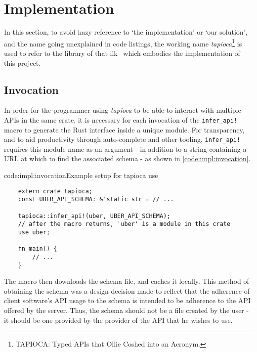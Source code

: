 \section{Implementation} \label{impl}

In this section, to avoid hazy reference to `the implementation' or `our solution', and the name going unexplained in code listings, the working name \emph{tapioca}\footnote{TAPIOCA: Typed APIs that Ollie Coshed into an Acronym.} is used to refer to the library of that ilk~\cite{tapioca} which embodies the implementation of this project.



\subsection{Invocation} \label{impl:invocation}

In order for the programmer using \emph{tapioca} to be able to interact with multiple APIs in the same crate, it is necessary for each invocation of the \texttt{infer_api!} macro to generate the Rust interface inside a unique module. For transparency, and to aid productivity through auto-complete and other tooling, \texttt{infer_api!} requires this module name as an argument - in addition to a string containing a URL at which to find the associated schema - as shown in \cref{code:impl:invocation}.

\begin{codelisting}{code:impl:invocation}{Example setup for tapioca use}
\begin{verbatim}
    extern crate tapioca;
    const UBER_API_SCHEMA: &'static str = // ...
    
    tapioca::infer_api!(uber, UBER_API_SCHEMA);
    // after the macro returns, 'uber' is a module in this crate
    use uber;
    
    fn main() {
        // ...
    }
\end{verbatim}
\end{codelisting}

The macro then downloads the schema file, and caches it locally. This method of obtaining the schema was a design decision made to reflect that the adherence of client software's API usage to the schema is intended to be adherence to the API offered by the server. Thus, the schema should not be a file created by the user - it should be one provided by the provider of the API that he wishes to use.

